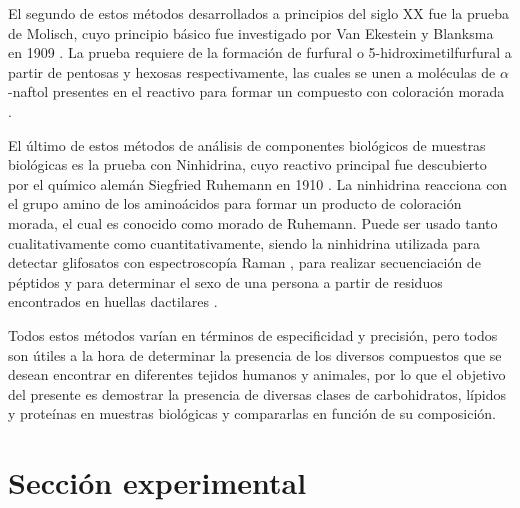 \documentclass[fleqn,10pt]{SelfArx}
\begin{document}
	El segundo de estos métodos desarrollados a principios del siglo XX fue la prueba de Molisch, cuyo principio básico fue investigado por Van Ekestein y Blanksma en 1909 \cite{van1910omega}. La prueba requiere de la formación de furfural o 5-hidroximetilfurfural a partir de pentosas y hexosas respectivamente, las cuales se unen a moléculas de $\alpha$-naftol presentes en el reactivo para formar un compuesto con coloración morada \cite{devor1950carbohydrate}. 
	
	El último de estos métodos de análisis de componentes biológicos de muestras biológicas es la prueba con Ninhidrina, cuyo reactivo principal fue descubierto por el químico alemán Siegfried Ruhemann en 1910 \cite{ruhemann1910cxxxii, ruhemann1910ccxii}. La ninhidrina reacciona con el grupo amino de los aminoácidos para formar un producto de coloración morada, el cual es conocido como morado de Ruhemann. Puede ser usado tanto cualitativamente como cuantitativamente, siendo la ninhidrina utilizada para detectar glifosatos con espectroscopía Raman \cite{xu2018indirect}, para realizar secuenciación de péptidos \cite{friedman2004applications} y para determinar el sexo de una persona a partir de residuos encontrados en huellas dactilares \cite{brunelle2016new}. 
	
	Todos estos métodos varían en términos de especificidad y precisión, pero todos son útiles a la hora de determinar la presencia de los diversos compuestos que se desean encontrar en diferentes tejidos humanos y animales, por lo que el objetivo del presente es demostrar la presencia de diversas clases de carbohidratos, lípidos y proteínas en muestras biológicas y compararlas en función de su composición. 

\section{Secci\'on experimental}
\end{document}
